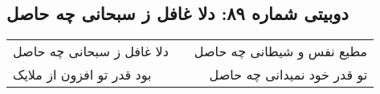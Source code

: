 \begin{center}
\section*{دوبیتی شماره ۸۹: دلا غافل ز سبحانی چه حاصل}
\label{sec:089}
\begin{longtable}{l p{0.5cm} r}
دلا غافل ز سبحانی چه حاصل
&&
مطیع نفس و شیطانی چه حاصل
\\
بود قدر تو افزون از ملایک
&&
تو قدر خود نمیدانی چه حاصل
\\
\end{longtable}
\end{center}
